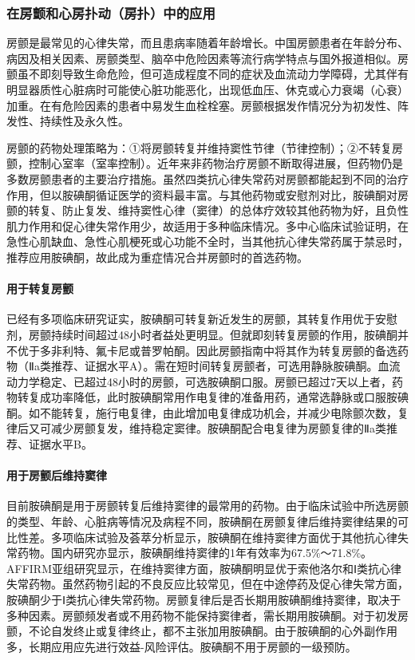 \subsubsection{在房颤和心房扑动（房扑）中的应用}

房颤是最常见的心律失常，而且患病率随着年龄增长。中国房颤患者在年龄分布、病因及相关因素、房颤类型、脑卒中危险因素等流行病学特点与国外报道相似。房颤虽不即刻导致生命危险，但可造成程度不同的症状及血流动力学障碍，尤其伴有明显器质性心脏病时可能使心脏功能恶化，出现低血压、休克或心力衰竭（心衰）加重。在有危险因素的患者中易发生血栓栓塞。房颤根据发作情况分为初发性、阵发性、持续性及永久性。

房颤的药物处理策略为：①将房颤转复并维持窦性节律（节律控制）；②不转复房颤，控制心室率（室率控制）。近年来非药物治疗房颤不断取得进展，但药物仍是多数房颤患者的主要治疗措施。虽然四类抗心律失常药对房颤都能起到不同的治疗作用，但以胺碘酮循证医学的资料最丰富。与其他药物或安慰剂对比，胺碘酮对房颤的转复、防止复发、维持窦性心律（窦律）的总体疗效较其他药物为好，且负性肌力作用和促心律失常作用少，故适用于多种临床情况。多中心临床试验证明，在急性心肌缺血、急性心肌梗死或心功能不全时，当其他抗心律失常药属于禁忌时，推荐应用胺碘酮，故此成为重症情况合并房颤时的首选药物。

\paragraph{用于转复房颤}

已经有多项临床研究证实，胺碘酮可转复新近发生的房颤，其转复作用优于安慰剂，房颤持续时间超过48小时者益处更明显。但就即刻转复房颤的作用，胺碘酮并不优于多非利特、氟卡尼或普罗帕酮。因此房颤指南中将其作为转复房颤的备选药物（Ⅱa类推荐、证据水平A）。需在短时间转复房颤者，可选用静脉胺碘酮。血流动力学稳定、已超过48小时的房颤，可选胺碘酮口服。房颤已超过7天以上者，药物转复成功率降低，此时胺碘酮常用作电复律的准备用药，通常选静脉或口服胺碘酮。如不能转复，施行电复律，由此增加电复律成功机会，并减少电除颤次数，复律后又可减少房颤复发，维持稳定窦律。胺碘酮配合电复律为房颤复律的Ⅱa类推荐、证据水平B。

\paragraph{用于房颤后维持窦律}

目前胺碘酮是用于房颤转复后维持窦律的最常用的药物。由于临床试验中所选房颤的类型、年龄、心脏病等情况及病程不同，胺碘酮在房颤复律后维持窦律结果的可比性差。多项临床试验及荟萃分析显示，胺碘酮在维持窦律方面优于其他抗心律失常药物。国内研究亦显示，胺碘酮维持窦律的1年有效率为67.5\%～71.8\%。AFFIRM亚组研究显示，在维持窦律方面，胺碘酮明显优于索他洛尔和Ⅰ类抗心律失常药物。虽然药物引起的不良反应比较常见，但在中途停药及促心律失常方面，胺碘酮少于Ⅰ类抗心律失常药物。房颤复律后是否长期用胺碘酮维持窦律，取决于多种因素。房颤频发者或不用药物不能保持窦律者，需长期用胺碘酮。对于初发房颤，不论自发终止或复律终止，都不主张加用胺碘酮。由于胺碘酮的心外副作用多，长期应用应先进行效益-风险评估。胺碘酮不用于房颤的一级预防。

